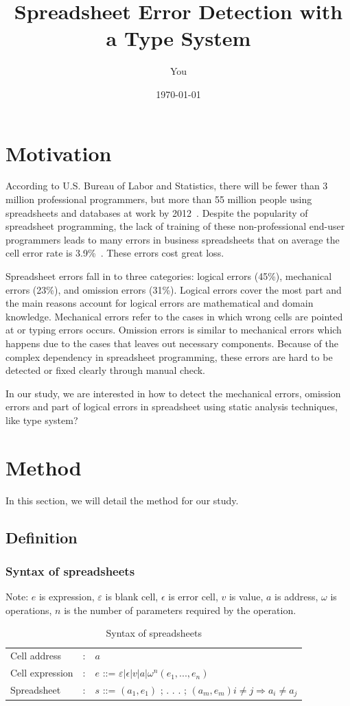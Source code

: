 \documentclass[a4paper]{article}
\title{Spreadsheet Error Detection with a Type System}
\author{You}
\date{\today}
\begin{document}
\maketitle


\section{Motivation}
According to U.S. Bureau of Labor and Statistics, there will be fewer than 3 million professional programmers, but more than 55 million people using spreadsheets and databases at work by 2012~\cite{scaffidi2005}. Despite the popularity of spreadsheet programming, the lack of training of these non-professional end-user programmers leads to many errors in business spreadsheets that on average the cell error rate is 3.9\%~\cite{panko2016we}. These errors cost great loss.

Spreadsheet errors fall in to three categories: logical errors (45\%), mechanical errors (23\%), and omission errors (31\%). Logical errors cover the most part and the main reasons account for logical errors are mathematical and domain knowledge. Mechanical errors refer to the cases in which wrong cells are pointed at or typing errors occurs. Omission errors is similar to mechanical errors which happens due to the cases that leaves out necessary components. Because of the complex dependency in spreadsheet programming, these errors are hard to be detected or fixed clearly through manual check.

In our study, we are interested in how to detect the mechanical errors, omission errors and part of logical errors in spreadsheet using static analysis techniques, like type system? 

\section{Method}
In this section, we will detail the method for our study.
\subsection{Definition}
\subsubsection{Syntax of spreadsheets}
Note: $e$ is expression, $\varepsilon$ is blank cell, $\epsilon$ is error cell, $v$ is value, $a$ is address, $\omega$ is operations, $n$ is the number of parameters required by the operation.
\begin{table}[h]
\centering
\caption{Syntax of spreadsheets}
\begin{tabular}{lll}
\hline
Cell address& : & $a$\\
Cell expression& : & $e$ ::= $\varepsilon | \epsilon | v | a | \omega^{n}(e_1, . . . , e_n)$\\
Spreadsheet&:& $s$ ::= $(a_1, e_1)$ ; . . . ; $(a_m, e_m) i \neq j \Rightarrow a_i \neq a_j$\\
\hline
  \end{tabular}
\label{syntax}
\end{table}
\end{document}
